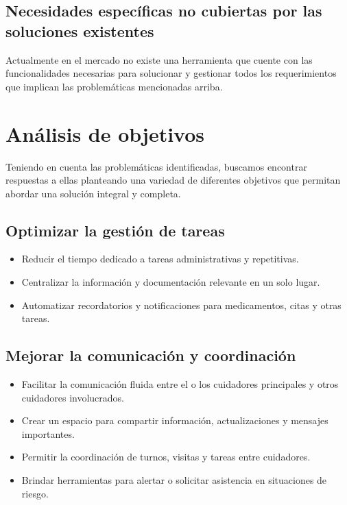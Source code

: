 \documentclass[a4paper,12pt]{article}
\begin{document}
    \subsection{Necesidades específicas no cubiertas por las soluciones existentes}
    \par Actualmente en el mercado no existe una herramienta que cuente con las funcionalidades necesarias para solucionar y gestionar todos los requerimientos que implican las problemáticas mencionadas arriba. 

    \newpage

    \section{Análisis de objetivos}
    \par Teniendo en cuenta las problemáticas identificadas, buscamos encontrar respuestas a ellas planteando una variedad de diferentes objetivos que permitan abordar una solución integral y completa.
    \subsection{Optimizar la gestión de tareas}
    \begin{itemize}
        \item Reducir el tiempo dedicado a tareas administrativas y repetitivas.
        \item Centralizar la información y documentación relevante en un solo lugar.
        \item Automatizar recordatorios y notificaciones para medicamentos, citas y otras tareas.
    \end{itemize}
    \subsection{Mejorar la comunicación y coordinación}
    \begin{itemize}
        \item Facilitar la comunicación fluida entre el o los cuidadores principales y otros cuidadores involucrados.
        \item Crear un espacio para compartir información, actualizaciones y mensajes importantes.
        \item Permitir la coordinación de turnos, visitas y tareas entre cuidadores.
        \item Brindar herramientas para alertar o solicitar asistencia en situaciones de riesgo.
    \end{itemize}
\end{document}
